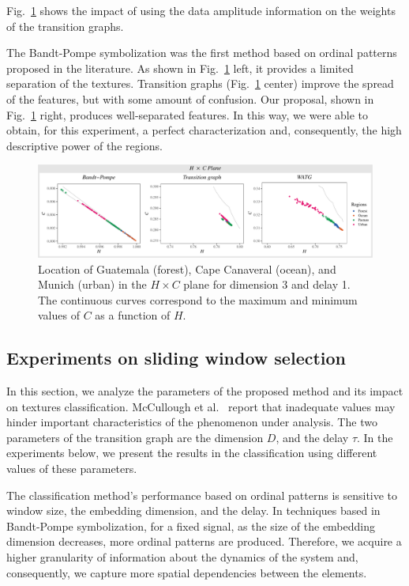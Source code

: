 \documentclass[journal]{IEEEtran}
\begin{document}
	Fig.~\ref{fig:plotsHC} shows the impact of using the data amplitude information on the weights of the transition graphs.
	
	The Bandt-Pompe symbolization was the first method based on ordinal patterns proposed in the literature.
	As shown in Fig.~\ref{fig:plotsHC} left, it provides a limited separation of the textures.
	Transition graphs (Fig.~\ref{fig:plotsHC} center) improve the spread of the features, but with some amount of confusion.
	Our proposal, shown in Fig.~\ref{fig:plotsHC} right, produces well-separated features.
	In this way, we were able to obtain, for this experiment, a perfect characterization and, consequently, the high descriptive power of the regions.
	
	\begin{figure}%
		\includegraphics[width=2\columnwidth]{Figures/HCAnalysis.pdf}
		\caption{Location of Guatemala (forest), Cape Canaveral (ocean), and Munich (urban) in the $H \times C$ plane for dimension 3 and delay 1. 
			The continuous curves correspond to the maximum and minimum values of $C$ as a function of $H$.}
		\label{fig:plotsHC}
	\end{figure}
	
	\subsection{Experiments on sliding window selection}
	
	In this section, we analyze the parameters of the proposed method and its impact on textures classification.
	McCullough et al.~\cite{McCullough2015lagged} report that inadequate values may hinder important characteristics of the phenomenon under analysis.
	The two parameters of the transition graph are the dimension $D$, and the delay $\tau$.
	In the experiments below, we present the results in the classification using different values of these parameters.
	
	The classification method's performance based on ordinal patterns is sensitive to window size, the embedding dimension, and the delay.
	In techniques based in Bandt-Pompe symbolization, for a fixed signal, as the size of the embedding dimension decreases, more ordinal patterns are produced.
	Therefore, we acquire a higher granularity of information about the dynamics of the system and, consequently, we capture more spatial dependencies between the elements.
	
\end{document}
